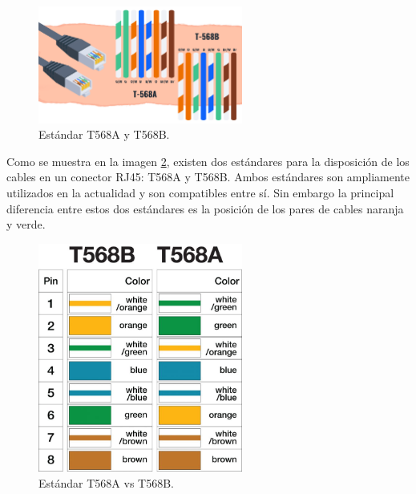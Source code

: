     \begin{figure}[H]
        \centering
        \includegraphics[width=0.6\textwidth]{img/estandar.jpg}
        \caption{Estándar T568A y T568B.}
        \label{fig:estandar}
    \end{figure}

    Como se muestra en la imagen \ref{fig:estandar_t568a_vs_t568b}, existen dos estándares para la disposición de los cables en un conector RJ45: T568A y T568B. Ambos estándares son ampliamente utilizados en la actualidad y son compatibles entre sí.
    Sin embargo la principal diferencia entre estos dos estándares es la posición de los pares de cables naranja y verde.

    \begin{figure}[H]
        \centering
        \includegraphics[width=0.6\textwidth]{img/T568AvsT568B.jpg}
        \caption{Estándar T568A vs T568B.}
        \label{fig:estandar_t568a_vs_t568b}
    \end{figure}

